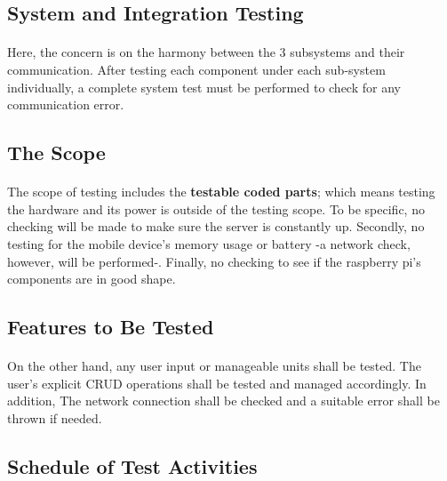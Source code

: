 \documentclass[12pt, oneside, a4paper]{book}
\begin{document}
			\subsection{System and Integration Testing}
			\paragraph{}Here, the concern is on the harmony between the 3 subsystems and their communication. After testing each component under each sub-system individually, a complete system test must be performed to check for any communication error.
			\subsection{The Scope}
			\paragraph{}The scope of testing includes the \textbf{testable coded parts}; which means testing the hardware and its power is outside of the testing scope. To be specific, no checking will be made to make sure the server is constantly up. Secondly, no testing for the mobile device's memory usage or battery -a network check, however, will be performed-. Finally, no checking to see if the raspberry pi's components are in good shape.
			\subsection{Features to Be Tested}
			\paragraph{}On the other hand, any user input or manageable units shall be tested. The user's explicit CRUD operations shall be tested and managed accordingly. In addition, The network connection shall be checked and a suitable error shall be thrown if needed. 
			\subsection{Schedule of Test Activities}
\end{document}
